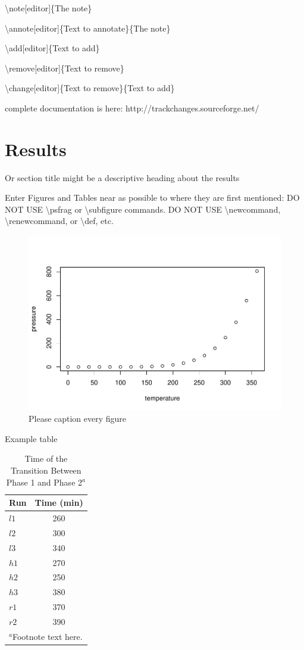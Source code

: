 \documentclass[draft,linenumbers]{agujournal2018}
\begin{document}
\textbackslash note{[}editor{]}\{The note\}

\textbackslash annote{[}editor{]}\{Text to annotate\}\{The note\}

\textbackslash add{[}editor{]}\{Text to add\}

\textbackslash remove{[}editor{]}\{Text to remove\}

\textbackslash change{[}editor{]}\{Text to remove\}\{Text to add\}

complete documentation is here: http://trackchanges.sourceforge.net/

\section{Results}

Or section title might be a descriptive heading about the results

Enter Figures and Tables near as possible to where they are first
mentioned: DO NOT USE \textbackslash psfrag or \textbackslash subfigure
commands. DO NOT USE \textbackslash newcommand,
\textbackslash renewcommand, or \textbackslash def, etc.

\begin{figure}[h]
\includegraphics{paper_files/figure-latex/unnamed-chunk-2-1} \caption{Please caption every figure}\label{fig:unnamed-chunk-2}
\end{figure}

Example table

\begin{table}
 \caption{Time of the Transition Between Phase 1 and Phase 2$^{a}$}
 \centering
 \begin{tabular}{l c}
 \hline
  Run  & Time (min)  \\
 \hline
   $l1$  & 260   \\
   $l2$  & 300   \\
   $l3$  & 340   \\
   $h1$  & 270   \\
   $h2$  & 250   \\
   $h3$  & 380   \\
   $r1$  & 370   \\
   $r2$  & 390   \\
 \hline
 \multicolumn{2}{l}{$^{a}$Footnote text here.}
 \end{tabular}
 \end{table}
\end{document}
